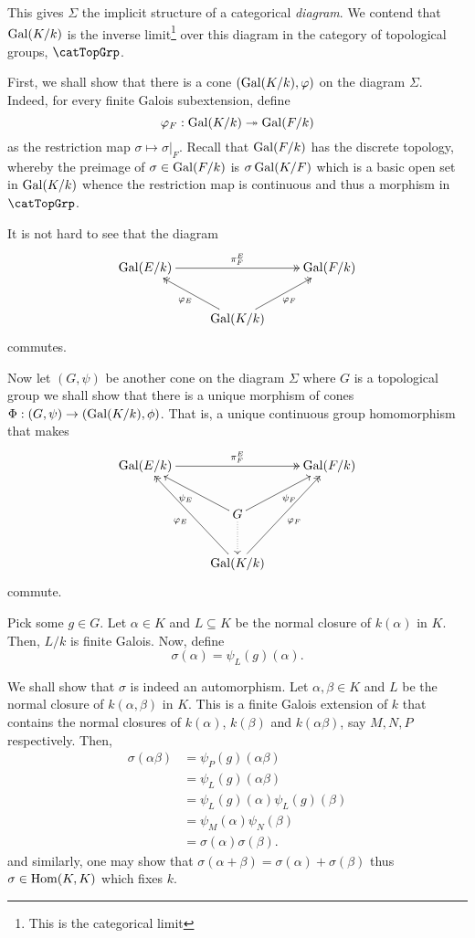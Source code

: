 This gives $\Sigma$ the implicit structure of a categorical \emph{diagram}. We contend that $\operatorname{Gal}(K/k)$ is the inverse limit\footnote{This is the categorical limit} over this diagram in the category of topological groups, $\catTopGrp$.

First, we shall show that there is a cone $(\operatorname{Gal}(K/k),\varphi)$ on the diagram $\Sigma$. Indeed, for every finite Galois subextension, define 
\begin{equation*}
    \varphi_F: \operatorname{Gal}(K/k)\twoheadrightarrow\operatorname{Gal}(F/k)
\end{equation*}
as the restriction map $\sigma\mapsto\sigma|_F$. Recall that $\operatorname{Gal}(F/k)$ has the discrete topology, whereby the preimage of $\sigma\in\operatorname{Gal}(F/k)$ is $\sigma\operatorname{Gal}(K/F)$ which is a basic open set in $\operatorname{Gal}(K/k)$ whence the restriction map is continuous and thus a morphism in $\catTopGrp$.

It is not hard to see that the diagram 
\begin{equation*}
    \xymatrix {
        \Gal(E/k)\ar@{->>}[rr]^{\pi^E_F} & & \Gal(F/k)\\
        & \Gal(K/k)\ar@{->>}[lu]^{\varphi_E}\ar@{->>}[ru]_{\varphi_F} &
    }
\end{equation*}
commutes.

Now let $(G,\psi)$ be another cone on the diagram $\Sigma$ where $G$ is a topological group we shall show that there is a unique morphism of cones $\Phi: (G,\psi)\to(\operatorname{Gal}(K/k),\phi)$. That is, a unique continuous group homomorphism that makes 
\begin{equation*}
    \xymatrix {
        \Gal(E/k)\ar@{->>}[rr]^{\pi^E_F} & & \Gal(F/k)\\
        & G\ar@{.>}[d]\ar@{->}[lu]^{\psi_E}\ar@{->}[ru]_{\psi_F} &\\
        & \Gal(K/k)\ar@{->>}[luu]^{\varphi_E}\ar@{->>}[ruu]_{\varphi_F} &
    }
\end{equation*}
commute.

Pick some $g\in G$. Let $\alpha\in K$ and $L\subseteq K$ be the normal closure of $k(\alpha)$ in $K$. Then, $L/k$ is finite Galois. Now, define 
\begin{equation*}
    \sigma(\alpha) = \psi_L(g)(\alpha).
\end{equation*}

We shall show that $\sigma$ is indeed an automorphism. Let $\alpha,\beta\in K$ and $L$ be the normal closure of $k(\alpha,\beta)$ in $K$. This is a finite Galois extension of $k$ that contains the normal closures of $k(\alpha)$, $k(\beta)$ and $k(\alpha\beta)$, say $M, N, P$ respectively. Then, 
\begin{align*}
    \sigma(\alpha\beta) &= \psi_P(g)(\alpha\beta)\\
    &= \psi_L(g)(\alpha\beta)\\
    &= \psi_L(g)(\alpha)\psi_L(g)(\beta)\\
    &= \psi_M(\alpha)\psi_N(\beta)\\
    &= \sigma(\alpha)\sigma(\beta).
\end{align*}
and similarly, one may show that $\sigma(\alpha + \beta) = \sigma(\alpha) + \sigma(\beta)$ thus $\sigma\in\operatorname{Hom}(K,K)$ which fixes $k$.

